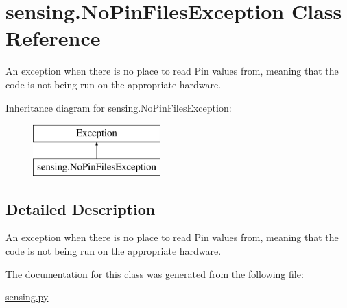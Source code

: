 \hypertarget{classsensing_1_1_no_pin_files_exception}{\section{sensing.\-No\-Pin\-Files\-Exception Class Reference}
\label{classsensing_1_1_no_pin_files_exception}
}


An exception when there is no place to read Pin values from, meaning that the code is not being run on the appropriate hardware.  


Inheritance diagram for sensing.\-No\-Pin\-Files\-Exception\-:\begin{figure}[H]
\begin{center}
\leavevmode
\includegraphics[height=2.000000cm]{classsensing_1_1_no_pin_files_exception}
\end{center}
\end{figure}


\subsection{Detailed Description}
An exception when there is no place to read Pin values from, meaning that the code is not being run on the appropriate hardware. 

The documentation for this class was generated from the following file\-:\begin{DoxyCompactItemize}
\item 
\hyperlink{sensing_8py}{sensing.\-py}\end{DoxyCompactItemize}
